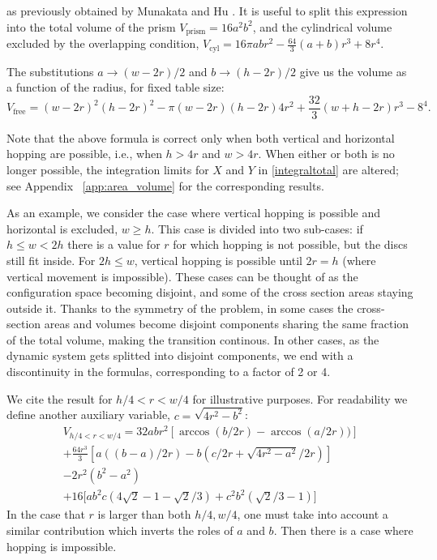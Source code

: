 \documentclass[superscriptaddress,pre,reprint,showpacs,onecolumn]{revtex4-1}
\begin{document}
as previously obtained by Munakata and Hu \cite{Munakata02}. 
It is useful to split this expression into the total volume of the prism 
$V_\text{prism}=16 a^2 b^2$, and the cylindrical volume excluded by the overlapping
condition, 
$V_\text{cyl}=  16 \pi a b r^{2} - \textstyle \frac{64}{3} (a+b) r^{3}  + 8 r^{4}$.

The substitutions $a\rightarrow (w-2r)/2$ and $b\rightarrow (h-2r)/2$ give us
 the volume as a function of the radius, for fixed table size:
\begin{equation}\label{volumewhd}
 V_\text{free} 
= (w-2r)^{2} (h-2r)^{2}  - 
 \pi (w-2r)(h-2r) 4 r^{2} + 
\textstyle \frac{32}{3} (w+h-2r) r^{3}  
- 8^{4}.
\end{equation}

Note that the above formula is correct only when both
vertical and horizontal hopping are possible, i.e., when $h > 4r$ and $w > 4r$.
When either or both is no longer possible, the 
integration limits for $X$ and $Y$ in \eqref{integraltotal} are altered; 
see Appendix ~\ref{app:area_volume} for the corresponding results.

As an example, we consider the case where vertical hopping is possible
and horizontal is excluded,  $w \geq h$.
This case is divided into two sub-cases: if
$ h \leq  w < 2 h $ there is a value for $r$ for which hopping is not possible,
but the discs still fit inside. For $ 2 h \leq w $, vertical hopping is
possible until $ 2 r= h$ (where vertical movement is impossible). These cases
can be thought of as the configuration space becoming disjoint, and
some of the cross section areas staying outside it. Thanks to the symmetry of
the problem, in some cases the cross-section areas and 
volumes become disjoint components sharing the same fraction of
the total volume, making the transition continous. In other cases, as the dynamic system
gets splitted into disjoint components, we end with a discontinuity in the formulas,
corresponding to a factor of 2 or 4. 


We cite the  result for $h/4  <r< w/4$ for illustrative purposes.
For readability we define another auxiliary variable,
$c=\sqrt{4r^2-b^2}$:
\begin{multline}\label{VolumenCasoFeo}
V_{h/4<r<w/4} = 32abr^2[\arccos(b/2r)-\arccos(a/2r))]\\
+\frac{64 r^3}{3 }[a((b-a)/2r)-b(c/2r+\sqrt{4r^2-a^2}/2r)]\\
-2r^2 (b^2-a^2)\\ 
+16[ a b^2 c (4\sqrt{2}-1-\sqrt{2}/3)
+c^2b^2 (\sqrt{2}/3-1) \big]
\end{multline}
In the case that $r$ is larger than both $h/4, w/4$, one must take
into account a similar
contribution which inverts the roles of $a$ and $b$. Then there is
a case where hopping is impossible. 
\end{document}
